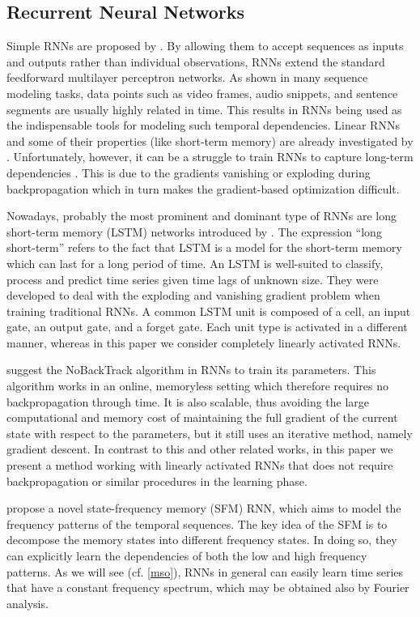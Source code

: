 \documentclass[preprint,12pt,times,authoryear]{elsarticle}%
\theoremstyle{definition}
\begin{document}
\subsection{Recurrent Neural Networks}

Simple RNNs are proposed by \citet{Elm90}. By allowing them to accept sequences
as inputs and outputs rather than individual observations, RNNs extend the
standard feedforward multilayer perceptron networks. As shown in many sequence
modeling tasks, data points such as video frames, audio snippets, and sentence
segments are usually highly related in time. This results in RNNs being used as
the indispensable tools for modeling such temporal dependencies. Linear RNNs and
some of their properties (like short-term memory) are already investigated by
\citet{WLS94}. Unfortunately, however, it can be a struggle to train RNNs to
capture long-term dependencies \citep{BSF94,PMB13}. This is due to the
gradients vanishing or exploding during backpropagation which in turn makes the
gradient-based optimization difficult.

Nowadays, probably the most prominent and dominant type of RNNs are long
short-term memory (LSTM) networks introduced by \citet{HS97}. The expression \enquote{long
short-term} refers to the fact that LSTM is a model for the short-term memory
which can last for a long period of time. An LSTM is well-suited to classify,
process and predict time series given time lags of unknown size. They were
developed to deal with the exploding and vanishing gradient problem when
training traditional RNNs. A common LSTM unit is composed of a cell,
an input gate, an output gate, and a forget gate. Each unit type is activated in
a different manner, whereas in this paper we consider completely linearly
activated RNNs.

\citet{OTC15} suggest the NoBackTrack algorithm in RNNs to
train its parameters. This algorithm works in an online, memoryless setting
which therefore requires no backpropagation through time. It is also scalable,
thus avoiding the large computational and memory cost of maintaining the full
gradient of the current state with respect to the parameters, but it still uses
an iterative method, namely gradient descent. In contrast to this and other
related works, in this paper we present a method working with linearly activated
RNNs that does not require backpropagation or similar procedures in the learning
phase.

\citet{HQ17} propose a novel state-frequency memory (SFM) RNN,
which aims to model the frequency patterns of the temporal sequences.
The key idea of the SFM is to decompose the memory states into different
frequency states. In doing so, they can explicitly learn the dependencies of
both the low and high frequency patterns. As we will see (cf. \cref{mso}),
RNNs in general can easily learn time series that have a constant frequency
spectrum, which may be obtained also by Fourier analysis.
\end{document}
